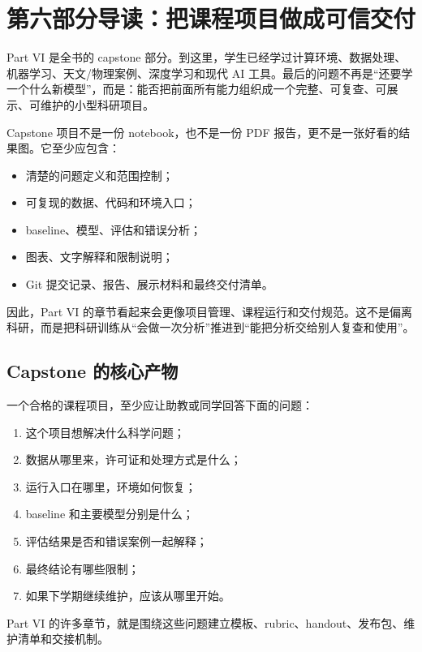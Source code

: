 \chapter*{第六部分导读：把课程项目做成可信交付}

Part VI 是全书的 capstone 部分。到这里，学生已经学过计算环境、数据处理、机器学习、天文/物理案例、深度学习和现代 AI 工具。最后的问题不再是“还要学一个什么新模型”，而是：能否把前面所有能力组织成一个完整、可复查、可展示、可维护的小型科研项目。

Capstone 项目不是一份 notebook，也不是一份 PDF 报告，更不是一张好看的结果图。它至少应包含：

\begin{itemize}
    \item 清楚的问题定义和范围控制；
    \item 可复现的数据、代码和环境入口；
    \item baseline、模型、评估和错误分析；
    \item 图表、文字解释和限制说明；
    \item Git 提交记录、报告、展示材料和最终交付清单。
\end{itemize}

因此，Part VI 的章节看起来会更像项目管理、课程运行和交付规范。这不是偏离科研，而是把科研训练从“会做一次分析”推进到“能把分析交给别人复查和使用”。

\section*{Capstone 的核心产物}

一个合格的课程项目，至少应让助教或同学回答下面的问题：

\begin{enumerate}
    \item 这个项目想解决什么科学问题；
    \item 数据从哪里来，许可证和处理方式是什么；
    \item 运行入口在哪里，环境如何恢复；
    \item baseline 和主要模型分别是什么；
    \item 评估结果是否和错误案例一起解释；
    \item 最终结论有哪些限制；
    \item 如果下学期继续维护，应该从哪里开始。
\end{enumerate}

Part VI 的许多章节，就是围绕这些问题建立模板、rubric、handout、发布包、维护清单和交接机制。

